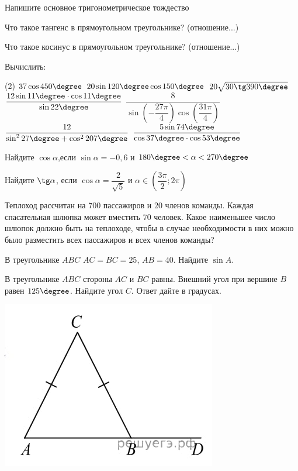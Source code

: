 \begin{exam}
	\begin{listofex}
		\item Напишите основное тригонометрическое тождество
		\item Что такое тангенс в прямоугольном треугольнике? (отношение...)
		\item Что такое косинус в прямоугольном треугольнике? (отношение...)
		\item Вычислить:
			\begin{tasks}(2)
				\task \( 37\cos450\degree \)
				\task \( 20\sin120\degree\cos150\degree \)
				\task \( 20\sqrt{30\tg390\degree} \)
				\task \( \dfrac{12\sin11\degree\cdot\cos11\degree}{\sin22\degree} \)
				\task \( \dfrac{8}{\sin\left( -\dfrac{27\pi}{4} \right)\cos\left( \dfrac{31\pi}{4} \right)} \)
				\task \( \dfrac{12}{\sin^227\degree+\cos^2207\degree} \)
				\task \( \dfrac{5\sin74\degree}{\cos37\degree\cdot\cos53\degree} \)
			\end{tasks}
		\item Найдите \(\cos\alpha\),\quad если \( \sin \alpha = -0,6 \) и \( 180\degree<\alpha<270\degree \)
		\item Найдите \( \tg\alpha \), \quad если \( \cos\alpha=\dfrac{2}{\sqrt{5}} \) и \( \alpha\in\left( \dfrac{3\pi}{2};2\pi \right) \)
		\item Теплоход рассчитан на \( 700  \) пассажиров и \( 20 \) членов команды. Каждая спасательная шлюпка может вместить \( 70 \) человек. Какое наименьшее число шлюпок должно быть на теплоходе, чтобы в случае необходимости в них можно было разместить всех пассажиров и всех членов команды?
		\item В треугольнике \( ABC \) \( AC = BC = 25 \), \( AB = 40 \). Найдите  \( \sin A \).
		\item
		\begin{minipage}[t]{0.57\textwidth}
			 В треугольнике \( ABC \) стороны \( AC  \) и \( BC  \) равны. Внешний угол при вершине \( B \) равен \( 125\degree\). Найдите угол \( C \). Ответ дайте в градусах.
		\end{minipage}
		\begin{minipage}[c]{0.3\textwidth}
			\includegraphics[align=t, width=\textwidth]{pics/G115M4L4-1}

\end{minipage}
\end{listofex}
\end{exam}
